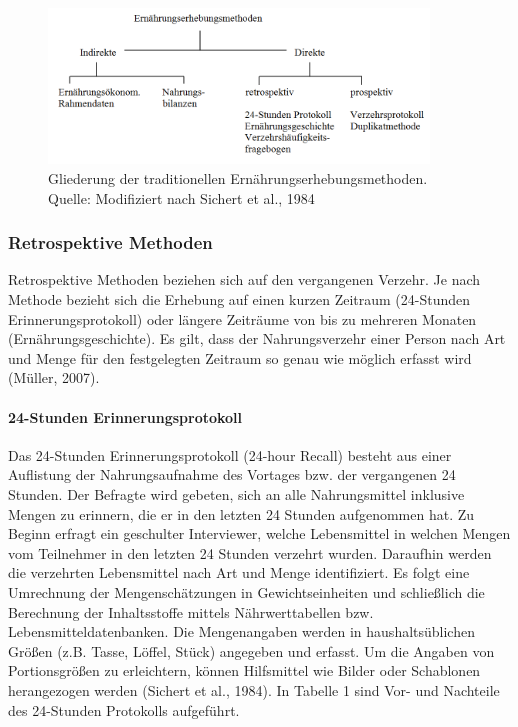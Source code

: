 \begin{figure}[!h]
	\centering
		
	\includegraphics[width=0.9\textwidth]{Bilder/Abb1.png}

	\caption[Gliederung der traditionellen Ernährungserhebungsmethoden]{Gliederung der traditionellen Ernährungserhebungsmethoden.\\ Quelle: Modifiziert nach Sichert et al., 1984}
	\label{bild1}
\end{figure}

\subsubsection{Retrospektive Methoden}

Retrospektive Methoden beziehen sich auf den vergangenen Verzehr. Je nach Methode bezieht sich die Erhebung auf einen kurzen Zeitraum (24-Stunden Erinnerungsprotokoll) oder längere Zeiträume von bis zu mehreren Monaten (Ernährungsgeschichte). Es gilt, dass der Nahrungsverzehr einer Person nach Art und Menge für den festgelegten Zeitraum so genau wie möglich erfasst wird (Müller, 2007).

\paragraph{24-Stunden Erinnerungsprotokoll}

Das 24-Stunden Erinnerungsprotokoll (24-hour Recall) besteht aus einer Auflistung der Nahrungsaufnahme des Vortages bzw. der vergangenen 24 Stunden. Der Befragte wird gebeten, sich an alle Nahrungsmittel inklusive Mengen zu erinnern, die er in den letzten 24 Stunden aufgenommen hat. Zu Beginn erfragt ein geschulter Interviewer, welche Lebensmittel in welchen Mengen vom Teilnehmer in den letzten 24 Stunden verzehrt wurden. Daraufhin werden die verzehrten Lebensmittel nach Art und Menge identifiziert. Es folgt eine Umrechnung der Mengenschätzungen in Gewichtseinheiten und schließlich die Berechnung der Inhaltsstoffe mittels Nährwerttabellen bzw. Lebensmitteldatenbanken. Die Mengenangaben werden in haushaltsüblichen Größen (z.B. Tasse, Löffel, Stück) angegeben und erfasst. Um die Angaben von Portionsgrößen zu erleichtern, können Hilfsmittel wie Bilder oder Schablonen herangezogen werden (Sichert et al., 1984). In Tabelle 1 sind Vor- und Nachteile des 24-Stunden Protokolls aufgeführt.

